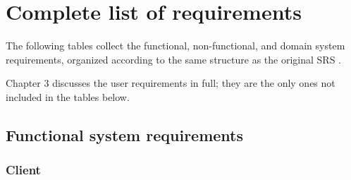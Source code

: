\chapter{Complete list of requirements}
\label{app:elenco-requisiti}

The following tables collect the functional, non-functional, and domain system requirements, organized 
according to the same structure as the original SRS \cite{ramusb-srs}.

Chapter 3 discusses the user requirements in full; they are the only ones not included in the 
tables below.

\section{Functional system requirements}

\subsection{Client}

